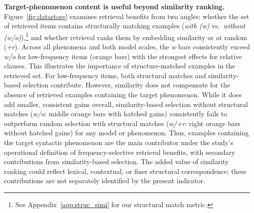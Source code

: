 \noindent \textbf{Target-phenomenon content is useful beyond similarity ranking.} Figure~\ref{fig:datastore} examines retrieval benefits from two angles: whether the set of retrieved items contains structurally matching examples (\emph{with (w)} vs.\ \emph{without (w/o)}),\footnote{See Appendix~\ref{app:struc_simi} for our structural match metric.} and whether retrieval ranks them by embedding similarity or at random (\emph{+r}). Across all phenomena and both model scales, the \emph{w} bars consistently exceed \emph{w/o} for low-frequency items (orange bars) with the strongest effects for relative clauses. This illustrates the importance of structure-matched examples in the retrieved set. For low-frequency items, both structural matches and similarity-based selection contribute. However, similarity does not compensate for the absence of retrieved examples containing the target phenomenon. While it does add smaller, consistent gains overall, similarity-based selection without structural matches (\textit{w/o}: middle orange bars with hatched gains) consistently fails to outperform random selection with structural matches (\textit{w/+r}: right orange bars without hatched gains) for any model or phenomenon. Thus, examples containing the target syntactic phenomenon are the main contributor under the study's operational definition of frequency-selective retrieval benefits, with secondary contributions from similarity-based selection. The added value of similarity ranking could reflect lexical, contextual, or finer structural correspondence; these contributions are not separately identified by the present indicator.





